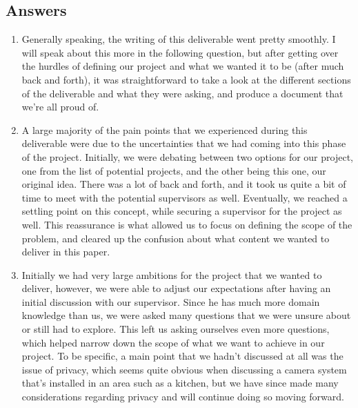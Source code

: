 \documentclass[12pt, titlepage]{article}
\begin{document}
\subsection*{Answers}
\begin{enumerate}
\item Generally speaking, the writing of this deliverable went pretty smoothly. I will speak about this more in the following question, but after getting over the hurdles of defining our project and what we wanted it to be (after much back and forth), it was straightforward to take a look at the different sections of the deliverable and what they were asking, and produce a document that we’re all proud of.
\item A large majority of the pain points that we experienced during this deliverable were due to the
uncertainties that we had coming into this phase of the project. Initially, we were debating between two options for our project, one from the list of potential projects, and the other being this one, our original idea. There was a lot of back and forth, and it took us quite a bit of time to meet with the potential supervisors as well. Eventually, we reached a settling point on this concept, while securing a supervisor for the project as well. This reassurance is what allowed us to focus on defining the scope of the problem, and cleared up the confusion about what content we wanted to deliver in this paper.
\item Initially we had very large ambitions for the project that we wanted to deliver, however, we were able to adjust our expectations after having an initial discussion with our supervisor. Since he has much more domain knowledge than us, we were asked many questions that we were unsure about or still had to explore. This left us asking ourselves even more questions, which helped narrow down the scope of what we want to achieve in our project. To be specific, a main point that we hadn’t discussed at all was the issue of privacy, which seems quite obvious when discussing a camera system that’s installed in an area such as a kitchen, but we have since made many considerations regarding privacy and will continue doing so moving forward.
\end{enumerate}
\end{document}
